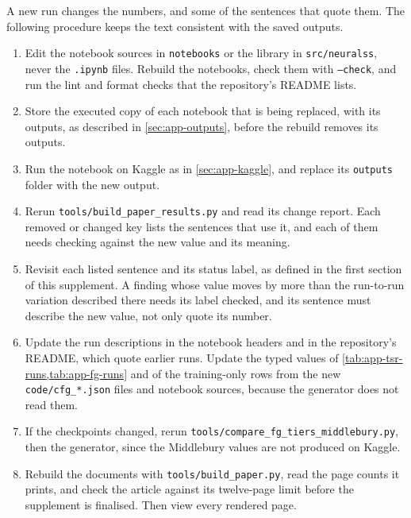 A new run changes the numbers, and some of the sentences that quote them. The following procedure keeps the text consistent with the saved outputs.

\begin{enumerate}
\item Edit the notebook sources in \texttt{notebooks} or the library in \texttt{src/neuralss}, never the \texttt{.ipynb} files. Rebuild the notebooks, check them with \texttt{--check}, and run the lint and format checks that the repository's README lists.
\item Store the executed copy of each notebook that is being replaced, with its outputs, as described in \cref{sec:app-outputs}, before the rebuild removes its outputs.
\item Run the notebook on Kaggle as in \cref{sec:app-kaggle}, and replace its \texttt{outputs} folder with the new output.
\item Rerun \texttt{tools/build\_paper\_results.py} and read its change report. Each removed or changed key lists the sentences that use it, and each of them needs checking against the new value and its meaning.
\item Revisit each listed sentence and its status label, as defined in the first section of this supplement. A finding whose value moves by more than the run-to-run variation described there needs its label checked, and its sentence must describe the new value, not only quote its number.
\item Update the run descriptions in the notebook headers and in the repository's README, which quote earlier runs. Update the typed values of \cref{tab:app-tsr-runs,tab:app-fg-runs} and of the training-only rows from the new \texttt{code/cfg\_*.json} files and notebook sources, because the generator does not read them.
\item If the checkpoints changed, rerun \texttt{tools/compare\_fg\_tiers\_middlebury.py}, then the generator, since the Middlebury values are not produced on Kaggle.
\item Rebuild the documents with \texttt{tools/build\_paper.py}, read the page counts it prints, and check the article against its twelve-page limit before the supplement is finalised. Then view every rendered page.
\end{enumerate}
